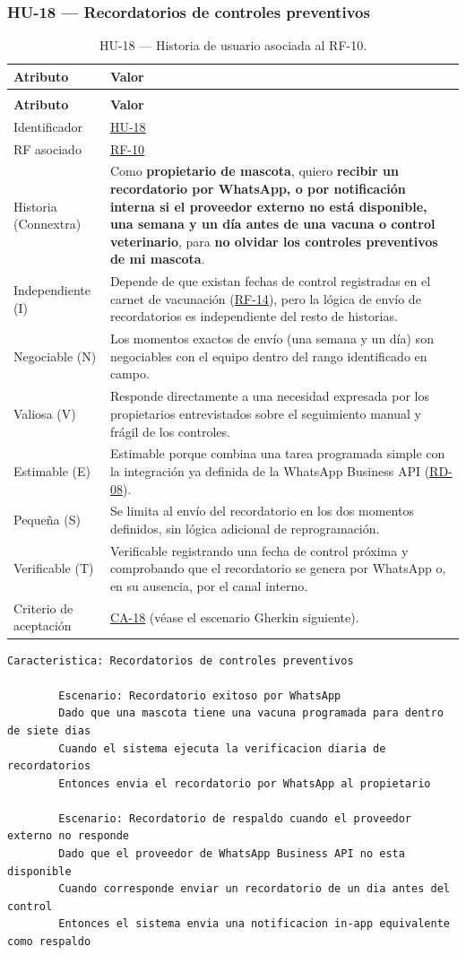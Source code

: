 \documentclass[journal,onecolumn]{IEEEtran}
\makeatletter
\newenvironment{atributos}[2]{%
	\small
	\begin{longtable}{@{}>{\raggedright\arraybackslash}p{4.2cm} >{\raggedright\arraybackslash}p{11.2cm}@{}}
		\caption{#2}\label{tab:#1}\\
		\toprule
		\textbf{Atributo} & \textbf{Valor} \\
		\midrule
		\endfirsthead
		\multicolumn{2}{@{}l}{\small\itshape (continuación)}\\
		\toprule
		\textbf{Atributo} & \textbf{Valor} \\
		\midrule
		\endhead
		\bottomrule
		\endlastfoot
	}{%
	\end{longtable}
	\normalsize
}
\makeatother
\begin{document}
	\subsubsection{HU-18 --- Recordatorios de controles preventivos}
	
	\begin{atributos}{HU-18}{HU-18 --- Historia de usuario asociada al RF-10.}
		Identificador & \hyperref[tab:HU-18]{HU-18} \\
		RF asociado & \hyperref[tab:RF-10]{RF-10} \\
		Historia (Connextra) & Como \textbf{propietario de mascota}, quiero \textbf{recibir un recordatorio por WhatsApp, o por notificación interna si el proveedor externo no está disponible, una semana y un día antes de una vacuna o control veterinario}, para \textbf{no olvidar los controles preventivos de mi mascota}. \\
		Independiente (I) & Depende de que existan fechas de control registradas en el carnet de vacunación (\hyperref[tab:RF-14]{RF-14}), pero la lógica de envío de recordatorios es independiente del resto de historias. \\
		Negociable (N) & Los momentos exactos de envío (una semana y un día) son negociables con el equipo dentro del rango identificado en campo. \\
		Valiosa (V) & Responde directamente a una necesidad expresada por los propietarios entrevistados sobre el seguimiento manual y frágil de los controles. \\
		Estimable (E) & Estimable porque combina una tarea programada simple con la integración ya definida de la WhatsApp Business API (\hyperref[tab:RD-08]{RD-08}). \\
		Pequeña (S) & Se limita al envío del recordatorio en los dos momentos definidos, sin lógica adicional de reprogramación. \\
		Verificable (T) & Verificable registrando una fecha de control próxima y comprobando que el recordatorio se genera por WhatsApp o, en su ausencia, por el canal interno. \\
		Criterio de aceptación & \hyperref[lst:ca18]{CA-18} (véase el escenario Gherkin siguiente). \\
	\end{atributos}
	
	\begin{lstlisting}[style=gherkin,caption={CA-18 --- Escenario de aceptación de la historia HU-18.},label={lst:ca18}]
		Caracteristica: Recordatorios de controles preventivos
		
		Escenario: Recordatorio exitoso por WhatsApp
		Dado que una mascota tiene una vacuna programada para dentro de siete dias
		Cuando el sistema ejecuta la verificacion diaria de recordatorios
		Entonces envia el recordatorio por WhatsApp al propietario
		
		Escenario: Recordatorio de respaldo cuando el proveedor externo no responde
		Dado que el proveedor de WhatsApp Business API no esta disponible
		Cuando corresponde enviar un recordatorio de un dia antes del control
		Entonces el sistema envia una notificacion in-app equivalente como respaldo
	\end{lstlisting}
	
\end{document}
